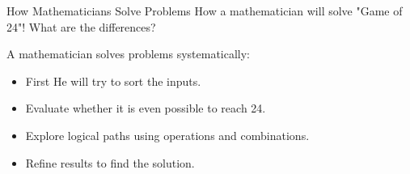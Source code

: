 \documentclass[aspectratio=169, xcolor={dvipsnames}, 10pt, brazil]{beamer}
\begin{document}
\begin{frame}{How Mathematicians Solve Problems}
How a mathematician will solve "Game of 24"! What are the differences?\\
\pause

A mathematician solves problems systematically:
    \begin{itemize}
         \item First He will try to sort the inputs.
\pause
        
            \item Evaluate whether it is even possible to reach 24.
\pause
            \item Explore logical paths using operations and combinations.
\pause
            \item Refine results to find the solution.
    \end{itemize}
\end{frame}
\end{document}
